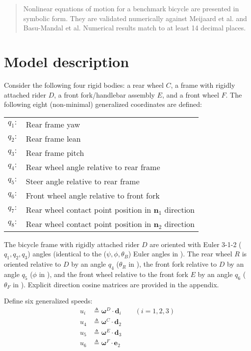 \documentclass[letterpaper,11pt]{article}
\newcommand{\bs}[1]{ \boldsymbol{ #1 } }
\begin{document}
\begin{abstract}

  Nonlinear equations of motion for a benchmark bicycle are presented in
  symbolic form.  They are validated numerically against Meijaard et al. and
  Basu-Mandal et al.  Numerical results match to at least 14 decimal places.

\end{abstract}

\section*{Model description}
Consider the following four rigid bodies: a rear wheel $C$, a frame with
rigidly attached rider $D$, a front fork/handlebar assembly $E$, and a front
wheel $F$.
The following eight (non-minimal) generalized coordinates are defined:
\begin{table}[h]
  \begin{center}
    \begin{tabular}{rl}
      $q_1:$ & Rear frame yaw \\
      $q_2:$ & Rear frame lean \\
      $q_3:$ & Rear frame pitch \\
      $q_4:$ & Rear wheel angle relative to rear frame \\
      $q_5:$ & Steer angle relative to rear frame \\
      $q_6:$ & Front wheel angle relative to front fork \\
      $q_7:$ & Rear wheel contact point position in $\bs{n}_1$ direction \\
      $q_8:$ & Rear wheel contact point position in $\bs{n}_2$ direction
    \end{tabular}
  \end{center}
\end{table}

The bicycle frame with rigidly attached rider $D$ are oriented with Euler 3-1-2
($q_1, q_2, q_3$) angles (identical to the ($\psi, \phi, \theta_B$) Euler angles
in \cite{Meijaard2007}).  The rear wheel $R$ is oriented relative to $D$ by
an angle $q_4$ ($\theta_R$ in \cite{Meijaard2007}), the front fork relative to
$D$ by an angle $q_5$ ($\phi$ in \cite{Meijaard2007}), and the front wheel
relative to the front fork $E$ by an angle $q_6$ ($\theta_F$ in
\cite{Meijaard2007}).  Explicit direction cosine matrices are provided in the
appendix.

Define six generalized speeds:
\begin{align*}
  u_i & \triangleq \bs{\omega}^D \cdot \bs{d}_i \qquad (i = 1, 2, 3)\\
  u_4 & \triangleq \bs{\omega}^C \cdot \bs{d}_2\\
  u_5 & \triangleq \bs{\omega}^E \cdot \bs{d}_3\\
  u_6 & \triangleq \bs{\omega}^F \cdot \bs{e}_2
\end{align*}
\end{document}
